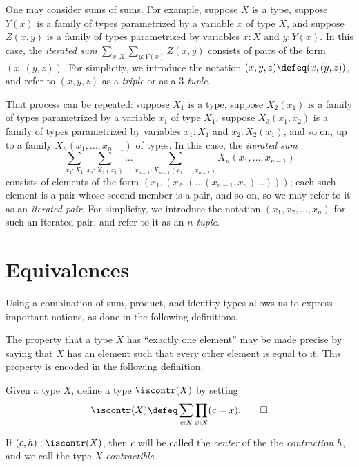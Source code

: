 \begin{remark}
  \label{iterated-sums}
  One may consider sums of sums.  For example, suppose $X$ is a type, suppose $Y(x)$ is a family of types parametrized by a variable $x$ of type $X$,
  and suppose $Z(x,y)$ is a family of types parametrized by variables $x:X$ and $y:Y(x)$.  In this case, the \emph{iterated sum}
  $\sum _{x:X} \sum_{y:Y(x)} Z(x,y)$ consists of pairs of the form $(x,(y,z))$.  For simplicity, we introduce the notation
  $(x,y,z) \defeq (x,(y,z))$, and refer to $(x,y,z)$ as a \emph{triple} or as a \emph{$3$-tuple}.

  That process can be repeated: suppose $X_1$ is a type, suppose $X_2(x_1)$ is a family of types parametrized by a variable $x_1$ of type $X_1$,
  suppose $X_3(x_1,x_2)$ is a family of types parametrized by variables $x_1:X_1$ and $x_2:X_2(x_1)$, and so on, up to a family
  $X_n(x_1,\dots,x_{n-1})$ of types.  In this case, the \emph{iterated sum}
  $$\sum _{x_1:X_1} \sum_{x_2:X_2(x_1)} \dots \sum_{x_{n-1}:X_{n-1}(x_1,\dots,x_{n-2})} X_n(x_1,\dots,x_{n-1}) $$
  consists of elements of the form
  $(x_1,(x_2,(\dots (x_{n-1},x_n)\dots)))$; each such element is a pair whose second member is a pair, and so on, so we may refer to it as an \emph{iterated pair}.
  For simplicity, we introduce the notation $(x_1,x_2,\dots,x_n)$ for such an iterated pair, and refer to it as an \emph{$n$-tuple}.
\end{remark}

\section{Equivalences}\label{sec:equivalence}

Using a combination of sum, product, and identity types allows
us to express important notions, as done in the following
definitions.

The property that a type $X$ has ``exactly one element'' may be made precise by saying that $X$ has an element such that every other element is equal to it.
This property is encoded in the following definition.

\begin{definition}
  \label{def:contractible}
  Given a type $X$, define a type $\iscontr(X)$ by setting
  \[
    \iscontr(X) \defeq \sum_{c:X} \prod_{x:X} (c=x).\qedhere
  \]
\end{definition}

If $ (c,h) : \iscontr(X) $, then $c$ will be called the \emph{center} of the
the \emph{contraction} $h$, and we call the type $X$ \emph{contractible}.

